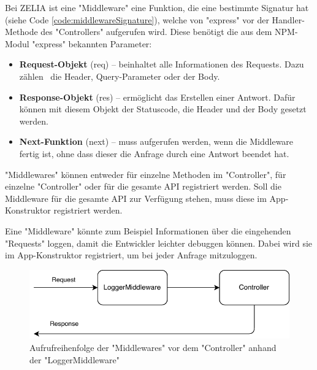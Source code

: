 \label{sec:middleware}

Bei ZELIA ist eine "Middleware" eine Funktion, die eine bestimmte Signatur hat (siehe Code \ref{code:middlewareSignature}), welche von "express" vor der Handler-Methode des "Controllers" aufgerufen wird. 
Diese benötigt die aus dem NPM-Modul "express" bekannten Parameter:

\begin{itemize}
    \item \textbf{Request-Objekt} ({\ttfamily req}) -- beinhaltet alle Informationen des Requests. Dazu zählen \zb\ die Header, Query-Parameter oder der Body.
    \item \textbf{Response-Objekt} ({\ttfamily res}) -- ermöglicht das Erstellen einer Antwort. Dafür können mit diesem Objekt der Statuscode, die Header und der Body gesetzt werden.
    \item \textbf{Next-Funktion} ({\ttfamily next}) -- muss aufgerufen werden, wenn die Middleware fertig ist, ohne dass dieser die Anfrage durch eine Antwort beendet hat.
\end{itemize}

"Middlewares" können entweder für einzelne Methoden im "Controller", für einzelne "Controller" oder für die gesamte API registriert werden. Soll die Middleware für die gesamte API zur Verfügung stehen, muss diese im App-Konstruktor registriert werden.



Eine "Middleware" könnte zum Beispiel Informationen über die eingehenden "Requests" loggen, damit die Entwickler leichter debuggen können. 
Dabei wird sie im \linebreak App-Konstruktor registriert, um bei jeder Anfrage mitzuloggen. 

\begin{figure}[H]
    \centering
    \includegraphics{media/APITemplate/LogMiddleware.svg.pdf}
    \caption{Aufrufreihenfolge der "Middlewares" vor dem "Controller" anhand der "LoggerMiddleware"} 
\end{figure}

